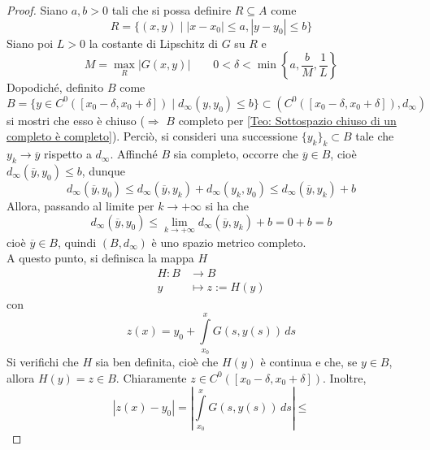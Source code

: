 \begin{proof}
Siano $a, b>0$ tali che si possa definire $R \subseteq A$ come
\begin{equation*}
    R= \{(x,y) \mid |x-x_0|\leq a, |y-y_0| \leq b \}
\end{equation*}
Siano poi $L>0$ la costante di Lipschitz di $G$ su $R$ e 
\begin{equation*}
M=\max\limits_{R}{|G(x, y)|} \qquad 0<\delta<\min\left\{a, \frac{b}{M}, \frac{1}{L}\right\}
\end{equation*}
Dopodiché, definito $B$ come
\begin{equation*}
    B=\{y \in C^0([x_0-\delta, x_0+\delta]) \mid d_\infty(y, y_0) \leq b\} \subset (C^0([x_0-\delta, x_0+\delta]), d_\infty)
\end{equation*}
si mostri che esso è chiuso ($\Rightarrow$ $B$ completo per \ref{Teo: Sottospazio chiuso di un completo è completo}).
Perciò, si consideri una successione $\{y_k\}_k \subset B$ tale che $y_k \to \overline{y}$ rispetto a $d_\infty$. Affinché $B$ sia completo, occorre che $\overline{y} \in B$, cioè $d_\infty(\overline{y},y_0)\leq b$, dunque
\begin{equation*}
    d_\infty(\overline{y},y_0) \leq d_\infty(\overline{y},y_k)+ d_\infty(y_k,y_0) \leq d_\infty(\overline{y},y_k) +b
\end{equation*}
Allora, passando al limite per $k \to +\infty$ si ha che
\begin{equation*}
    d_\infty(\overline{y},y_0) \leq \lim_{k \to +\infty}{d_\infty(\overline{y},y_k) +b}= 0+b= b
\end{equation*}
cioè $\overline{y} \in B$, quindi $(B, d_\infty)$ è uno spazio metrico completo.\\
A questo punto, si definisca la mappa $H$
\begin{equation*}
    \begin{aligned}
        H: B &\to B\\
        y &\mapsto z:=H(y)
    \end{aligned}
\end{equation*}
con
\begin{equation*}
    z(x)=y_0+ \int\limits_{x_0}^{x}{G(s, y(s))}\,ds
\end{equation*}
Si verifichi che $H$ sia ben definita, cioè che $H(y)$ è continua e che, se $y \in B$, allora $H(y)=z \in B$. Chiaramente $z \in C^0([x_0-\delta, x_0+\delta])$. Inoltre,
\begin{equation*}
    |z(x)-y_0|=\left|\int\limits_{x_0}^{x}{G(s, y(s))}\,ds\right| \leq

\end{equation*}
\end{proof}
